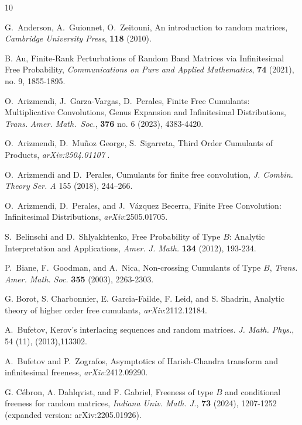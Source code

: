 \documentclass[11pt]{amsart}
\theoremstyle{definition}
\numberwithin{theorem}{section}
\begin{document}
\begin{thebibliography}{10}

 G.~Anderson, A.~Guionnet, O.~Zeitouni, An
  introduction to random matrices, \textit{Cambridge
    University Press}, \textbf{118} (2010).
  
 B. Au, Finite‐Rank Perturbations of Random Band
  Matrices via Infinitesimal Free Probability,
  \textit{Communications on Pure and Applied Mathematics},
  \textbf{74} (2021), no. 9, 1855-1895.

 O.~Arizmendi, J.~Garza-Vargas, D.~Perales,
  Finite Free Cumulants: Multiplica\-tive Convolutions,
  Genus Expansion and Infinitesimal Distributions,
  \textit{Trans.} \textit{Amer. Math.~Soc.}, \textbf{376}
  no. 6 (2023), 4383-4420.

 O.~Arizmendi, D.~Muñoz George, S.~Sigarreta,
  Third Order Cumulants of Products,
  \textit{arXiv:2504.01107 }.
  
 O.~Arizmendi and D.~Perales, Cumulants for
  finite free convolution, \textit{J. Combin. Theory Ser. A}
  155 (2018), 244–266.

 O.~Arizmendi, D.~Perales, and J.~Vázquez
  Becerra, Finite Free Convolution: Infinitesimal
  Distributions, \textit{arXiv}:2505.01705.

 S.~Belinschi and D.~Shlyakhtenko, Free
  Probability of Type $B$: Analytic Interpretation and
  Applications, \textit{Amer. J. Math.} \textbf{134} (2012),
  193-234.

 P.~Biane, F.~Goodman, and A.~Nica,
  Non-crossing Cumulants of Type $B$,
  \textit{Trans. Amer. Math. Soc.} \textbf{355} (2003),
  2263-2303.

 G. Borot, S. Charbonnier, E. Garcia-Failde,
  F. Leid, and S. Shadrin, Analytic theory of higher order
  free cumulants, \textit{arXiv}:2112.12184.
  
 A.~Bufetov, Kerov’s interlacing sequences and
  random matrices. \textit{J. Math. Phys.}, 54 (11),
  (2013),113302.

 A.~Bufetov and P.~Zografos, Asymptotics of
  Harish-Chandra transform and infinitesimal freeness,
  \textit{arXiv}:2412.09290.

 G. Cébron, A. Dahlqvist, and F. Gabriel,
  Freeness of type $ B $ and conditional freeness for random
  matrices, \textit{Indiana Univ. Math. J.}, \textbf{73}
  (2024), 1207-1252 (expanded version: arXiv:2205.01926).



\end{thebibliography}
\end{document}
